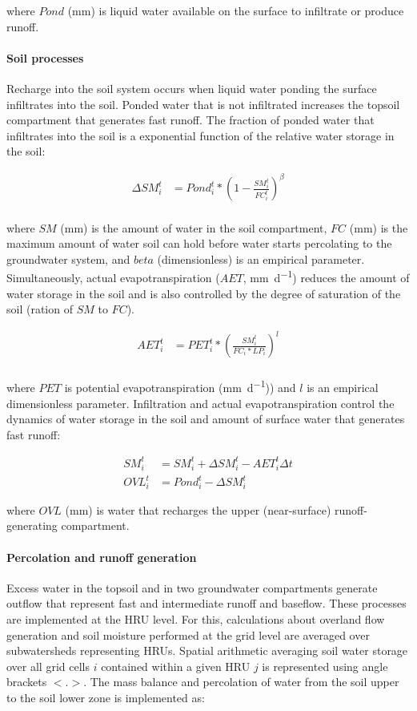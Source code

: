 \documentclass[review]{elsarticle}
\begin{document}
\noindent where $Pond$ (\si{\milli\metre}) is liquid water available on the surface to infiltrate or produce runoff. 

\paragraph{Soil processes}  
Recharge into the soil system occurs when liquid water ponding the surface infiltrates into the soil. Ponded water that is not infiltrated increases the topsoil compartment that generates fast runoff. The fraction of ponded water that infiltrates into the soil is a exponential function of the relative water storage in the soil: 

\begin{align}
\Delta SM_i^t &= Pond_i^t * \left(1 - \frac{SM_i^t}{FC_i^t} \right)^\beta \\
\end{align} 

\noindent where $SM$ (\si{\milli\metre}) is the amount of water in the soil compartment, $FC$ (\si{\milli\metre}) is the maximum amount of water soil can hold before water starts percolating to the groundwater system, and $beta$ (dimensionless) is an empirical parameter. Simultaneously, actual evapotranspiration ($AET$, \si{\milli\metre\per\day}) reduces the amount of water storage in the soil and is also controlled by the degree of saturation of the soil (ration of $SM$ to $FC$). 

\begin{align}
AET_i^t &= PET_i^t * \left(\frac{SM_i^t}{FC_i * LP_i} \right)^l	 \\
\end{align} 

\noindent where $PET$ is potential evapotranspiration (\si{\milli\metre\per\day})) and $l$ is an empirical dimensionless parameter. Infiltration and actual evapotranspiration control the dynamics of water storage in the soil and amount of surface water that generates fast runoff:

\begin{align}
SM_i^t &= SM_i^{t} + \Delta SM_i^t - AET_i^t \Delta t\\
OVL_i^t &= Pond_i^t - \Delta SM_i^t
\end{align}

\noindent where $OVL$ (\si{\milli\metre}) is water that recharges the upper (near-surface) runoff-generating compartment.

\paragraph{Percolation and runoff generation}
Excess water in the topsoil and in two groundwater compartments generate outflow that represent fast and intermediate runoff and baseflow. These processes are implemented at the HRU level. For this, calculations about overland flow generation and soil moisture performed at the grid level are averaged over subwatersheds representing HRUs. Spatial arithmetic averaging soil water storage over all grid cells $i$ contained within a given HRU $j$ is represented using angle brackets $<.>$. The mass balance and percolation of water from the soil upper to the soil lower zone is implemented as:
\end{document}
